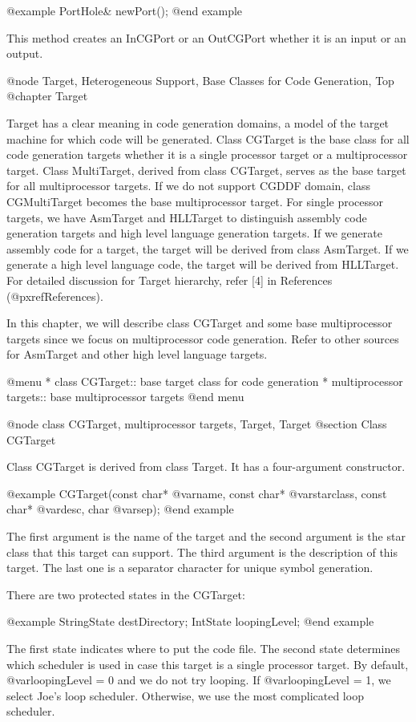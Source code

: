 @example
PortHole& newPort();
@end example

This method creates an InCGPort or an OutCGPort whether it is an input or an
output.

@node Target, Heterogeneous Support, Base Classes for Code Generation, Top
@chapter Target

Target has a clear meaning in code generation domains, a model of
the target machine for which code will be generated. Class CGTarget is the
base class for all code generation targets whether it is a single
processor target or a multiprocessor target. Class MultiTarget,
derived from class CGTarget, serves as the base target for all
multiprocessor targets. If we do not support CGDDF domain, class
CGMultiTarget becomes the base multiprocessor target. For
single processor targets, we have AsmTarget and HLLTarget to distinguish
assembly code generation targets and high level language generation targets.
If we generate assembly code for a target, the target will be derived from
class AsmTarget. If we generate a high level language code, the target
will be derived from HLLTarget. For detailed discussion for Target
hierarchy, refer [4] in References (@pxref{References}).

In this chapter, we will describe class CGTarget and some base multiprocessor
targets since we focus on multiprocessor code generation. Refer to
other sources for AsmTarget and other high level language targets.
 
@menu
* class CGTarget::			base target class for code generation
* multiprocessor targets::		base multiprocessor targets
@end menu

@node class CGTarget, multiprocessor targets, Target, Target
@section Class CGTarget

Class CGTarget is derived from class Target. It has a four-argument
constructor.

@example
CGTarget(const char* @var{name}, const char* @var{starclass}, const char* @var{desc}, char @var{sep});
@end example

The first argument is the name of the target and the second argument is the
star class that this target can support. The third argument is the description
of this target. The last one is a separator character for unique symbol
generation.

There are two protected states in the CGTarget:

@example
StringState destDirectory;
IntState loopingLevel;
@end example

The first state indicates where to put the code file. The second state
determines which scheduler is used in case this target is a single
processor target. By default, @var{loopingLevel} = 0 and we do not
try looping. If @var{loopingLevel} = 1, we select Joe's loop scheduler.
Otherwise, we use the most complicated loop scheduler.

